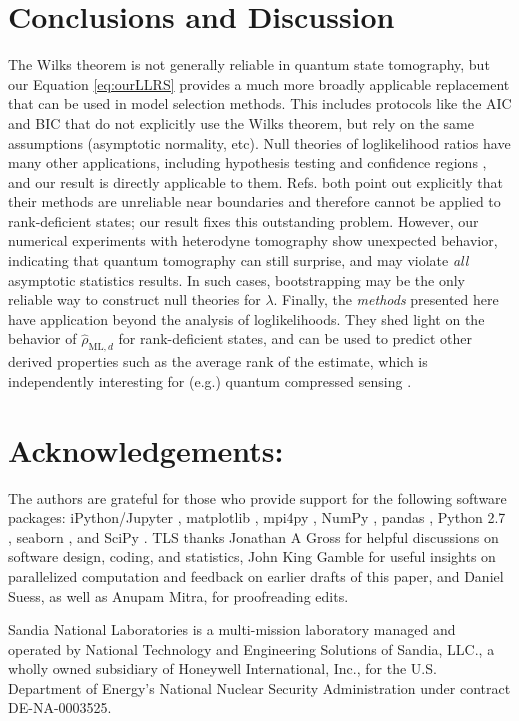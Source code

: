 \documentclass[aps,pra, twocolumn]{revtex4-1}
\newcommand{\rhohat}{\hat{\rho}}
\newcommand{\rhoML}[1]{\rhohat_{\scriptscriptstyle{\mathrm{ML},#1}}}
\begin{document}
\section{Conclusions and Discussion}
The Wilks theorem is not generally reliable in quantum state tomography, but our Equation \eqref{eq:ourLLRS} provides a much more broadly applicable replacement that can be used in model selection methods.  This includes protocols like the AIC and BIC \cite{Akaike1974, Schwarz1978, Kass1995, Burnham2004} that do not explicitly use the Wilks theorem, but rely on the same assumptions (asymptotic normality, etc).  Null theories of loglikelihood ratios have many other applications, including hypothesis testing \cite{Blume-Kohout2010,Moroder2013} and confidence regions \cite{Glancy2012a}, and our result is directly applicable to them.  Refs. \cite{Moroder2013,Glancy2012a} both point out explicitly that their methods are unreliable near boundaries and therefore cannot be applied to rank-deficient states; our result fixes this outstanding problem.  However, our numerical experiments with heterodyne tomography show unexpected behavior, indicating that quantum tomography can still surprise, and may violate \emph{all} asymptotic statistics results.  In such cases, bootstrapping \cite{Efron1979, Higgins2004} may be the only reliable way to construct null theories for $\lambda$.  Finally, the \emph{methods} presented here have application beyond the analysis of loglikelihoods.  They shed light on the behavior of $\rhoML{d}$ for rank-deficient states, and can be used to predict other derived properties such as the average rank of the estimate, which is independently interesting for (e.g.) quantum compressed sensing \cite{Flammia2012a, Steffens2016, Kalev2015, Kalev2015a}.

\section{Acknowledgements:} The authors are grateful for those who provide support for the following software packages: iPython/Jupyter \cite{Perez}, matplotlib
\cite{Hunter2007}, mpi4py \cite{Dalcin2011},  NumPy \cite{VanDerWalt2011}, pandas \cite{mckinney2010}, Python 2.7 
\cite{vanRossum}, seaborn \cite{Waskom2016}, and SciPy \cite{Oliphant2007a}. TLS thanks Jonathan A Gross for helpful 
discussions on software design, coding, and statistics, John King Gamble for useful insights on parallelized 
computation and feedback on earlier drafts of this paper, and Daniel Suess, as well as Anupam Mitra, for proofreading edits.

Sandia National Laboratories is a multi-mission laboratory managed and operated by National Technology and Engineering Solutions of Sandia, LLC., a wholly owned subsidiary of Honeywell International, Inc., for the U.S. Department of Energy's National Nuclear Security Administration under contract DE-NA-0003525.



\end{document}
